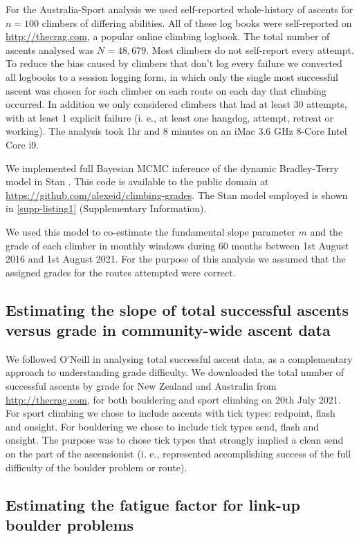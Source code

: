 \documentclass{article}
\begin{document}
For the Australia-Sport analysis we used self-reported whole-history of ascents for $n=100$ climbers of differing abilities. All of these log books were self-reported on \url{http://thecrag.com}, a popular online climbing logbook. The total number of ascents analysed was $N=48,679$. Most climbers do not self-report every attempt. To reduce the bias caused by climbers that don't log every failure we converted all logbooks to a session logging form, in which only the single most successful ascent was chosen for each climber on each route on each day that climbing occurred. In addition we only considered climbers that had at least 30 attempts, with at least 1 explicit failure (i. e., at least one \gls{hangdog}, attempt, retreat or working). The analysis took 1hr and 8 minutes on an iMac 3.6 GHz 8-Core Intel Core i9.

We implemented full Bayesian MCMC inference of the dynamic Bradley-Terry model in Stan \cite{carpenter2017stan}. This code is available to the public domain at \url{https://github.com/alexeid/climbing-grades}.
The Stan model employed is shown in \cref{supp-listing1} (Supplementary Information).

We used this model to co-estimate the fundamental slope parameter $m$ and the grade of each climber in monthly windows during 60 months between 1st August 2016 and 1st August 2021. For the purpose of this analysis we assumed that the assigned grades for the routes attempted were correct.

\subsection*{Estimating the slope of total successful ascents versus grade in community-wide ascent data}

We followed O'Neill \cite{oneill2002} in analysing total successful ascent data, as a complementary approach to understanding grade difficulty. We downloaded the total number of successful ascents by grade for New Zealand and Australia from \url{http://thecrag.com}, for both bouldering and sport climbing on 20th July 2021. For sport climbing we chose to include ascents with tick types: \gls{redpoint}, \gls{flash} and \gls{onsight}. For bouldering we chose to include tick types \gls{send}, \gls{flash} and \gls{onsight}. The purpose was to chose tick types that strongly implied a clean send on the part of the ascensionist (i. e., represented accomplishing success of the full difficulty of the boulder problem or route).
\subsection*{Estimating the fatigue factor for link-up boulder problems}
\end{document}
